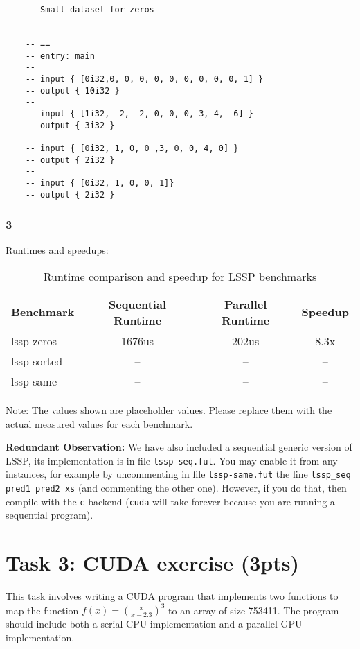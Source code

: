 \documentclass{article}
\begin{document}
\begin{itemize}
\begin{lstlisting}
    -- Small dataset for zeros


    -- ==
    -- entry: main
    -- 
    -- input { [0i32,0, 0, 0, 0, 0, 0, 0, 0, 0, 1] }
    -- output { 10i32 }
    --
    -- input { [1i32, -2, -2, 0, 0, 0, 3, 4, -6] }
    -- output { 3i32 }
    --
    -- input { [0i32, 1, 0, 0 ,3, 0, 0, 4, 0] }
    -- output { 2i32 }
    --
    -- input { [0i32, 1, 0, 0, 1]}
    -- output { 2i32 }
    \end{lstlisting}

    \subsubsection*{3}

    Runtimes and speedups:

    \begin{table}[h]
    \centering
    \begin{tabular}{|l|c|c|c|}
    \hline
    Benchmark & Sequential Runtime & Parallel Runtime & Speedup \\
    \hline
    lssp-zeros & 1676us & 202us & 8.3x \\
    lssp-sorted & -- & -- & -- \\
    lssp-same & -- & -- & -- \\
    \hline
    \end{tabular}
    \caption{Runtime comparison and speedup for LSSP benchmarks}
    \label{tab:lssp-benchmarks}
    \end{table}

    Note: The values shown are placeholder values. Please replace them with the actual measured values for each benchmark.




\end{itemize}

\textbf{Redundant Observation:} We have also included a sequential generic version of LSSP, its implementation is in file \texttt{lssp-seq.fut}. You may enable it from any instances, for example by uncommenting in file \texttt{lssp-same.fut} the line \texttt{lssp\_seq pred1 pred2 xs} (and commenting the other one). However, if you do that, then compile with the \texttt{c} backend (\texttt{cuda} will take forever because you are running a sequential program). 
\section{Task 3: CUDA exercise (3pts)}

This task involves writing a CUDA program that implements two functions to map the function $f(x) = (\frac{x}{x-2.3})^3$ to an array of size 753411. The program should include both a serial CPU implementation and a parallel GPU implementation.
\end{document}
